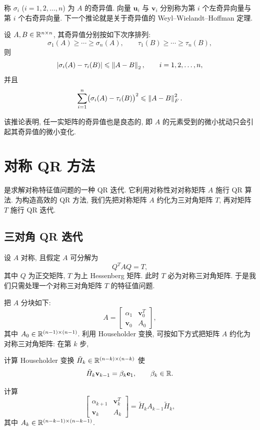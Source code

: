 称 $\sigma_i$ ($i=1,2,\ldots,n$) 为 $A$ 的奇异值. 向量 $\mathbf{u}_i$ 与 $\mathbf{v}_i$ 分别称为第 $i$ 个左奇异向量与第 $i$ 个右奇异向量. 下一个推论就是关于奇异值的 Weyl--Wielandt--Hoffman 定理.

\begin{corollary}
\label{cor:8-1}
设 $A,B\in\mathbb{R}^{n\times n}$, 其奇异值分别按如下次序排列:
\[
  \sigma_1(A)\geqslant\cdots\geqslant\sigma_n(A),
  \qquad
  \tau_1(B)\geqslant\cdots\geqslant\tau_n(B),
\]
则
\[
  \left|\sigma_i(A)-\tau_i(B)\right|\leqslant\left\|A-B\right\|_2,
  \qquad i=1,2,\ldots,n,
\]
并且
\[
  \sum_{i=1}^{n}\bigl(\sigma_i(A)-\tau_i(B)\bigr)^2\leqslant\left\|A-B\right\|_F^2.
\]
\end{corollary}

该推论表明, 任一实矩阵的奇异值也是良态的, 即 $A$ 的元素受到的微小扰动只会引起其奇异值的微小变化.

\section{对称 QR 方法}
\label{sec:8-2}

是求解对称特征值问题的一种 QR 迭代. 它利用对称性对对称矩阵 $A$ 施行 QR 算法. 为构造高效的 QR 方法, 我们先把对称矩阵 $A$ 约化为三对角矩阵 $T$, 再对矩阵 $T$ 施行 QR 迭代.

\subsection{三对角 QR 迭代}
\label{sec:8-2-1}

设 $A$ 对称, 且假定 $A$ 可分解为
\[
  Q^TAQ=T,
\]
其中 $Q$ 为正交矩阵, $T$ 为上 Hessenberg 矩阵. 此时 $T$ 必为对称三对角矩阵. 于是我们只需处理一个对称三对角矩阵 $T$ 的特征值问题.

把 $A$ 分块如下:
\[
  A=\begin{bmatrix}
    \alpha_1 & \mathbf{v}_0^T\\
    \mathbf{v}_0 & A_0
  \end{bmatrix},
\]
其中 $A_0\in\mathbb{R}^{(n-1)\times(n-1)}$. 利用 Householder 变换, 可按如下方式把矩阵 $A$ 约化为对称三对角矩阵: 在第 $k$ 步,
\begin{parenlist}
  \item 计算 Householder 变换 $\tilde{H}_k\in\mathbb{R}^{(n-k)\times(n-k)}$ 使
    \[
      \tilde{H}_k\mathbf{v}_{k-1}=\beta_k\mathbf{e}_1,
      \qquad \beta_k\in\mathbb{R}.
    \]
  \item 计算
    \[
      \begin{bmatrix}
        \alpha_{k+1} & \mathbf{v}_k^T\\
        \mathbf{v}_k & A_k
      \end{bmatrix}
      =\tilde{H}_kA_{k-1}\tilde{H}_k,
    \]
    其中 $A_k\in\mathbb{R}^{(n-k-1)\times(n-k-1)}$.
\end{parenlist}


